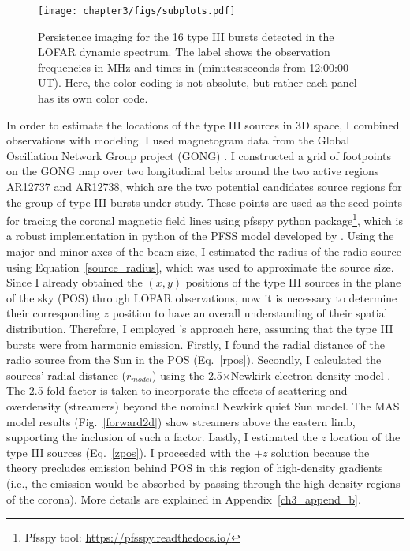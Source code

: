 \begin{figure}[ht]
\centering
\texttt{[image: chapter3/figs/subplots.pdf]}
\caption{Persistence imaging for the 16 type III bursts detected in the LOFAR dynamic spectrum. The label shows the observation frequencies in MHz and times in (minutes:seconds from 12:00:00 UT). Here, the color coding is not absolute, but rather each panel has its own color code.}
\label{fig_persistence}
\end{figure}

In order to estimate the locations of the type III sources in 3D space, I combined observations with modeling. I used magnetogram data from the Global Oscillation Network Group project (GONG) \citep{gong_1996}. I constructed a grid of footpoints on the GONG map over two longitudinal belts around the two active regions AR12737 and AR12738, which are the two potential candidates source regions for the group of type III bursts under study. These points are used as the seed points for tracing the coronal magnetic field lines using pfsspy python package\footnote{Pfsspy tool: \url{https://pfsspy.readthedocs.io/}}, which is a robust implementation in python of the PFSS model developed by \citet{pfss_2020}.
Using the major and minor axes of the beam size, I estimated the radius of the radio source using Equation~\ref{source_radius}, which was used to approximate the source size.
Since I already obtained the $(x,y)$ positions of the type III sources in the plane of the sky (POS) through LOFAR observations, now it is necessary to determine their corresponding $z$ position to have an overall understanding of their spatial distribution. Therefore, I employed \citet{badman_2022}'s approach here, assuming that the type III bursts were from harmonic emission. Firstly, I found the radial distance of the radio source from the Sun in the POS (Eq.~\ref{rpos}). Secondly, I calculated the sources' radial distance ($r_{model}$) using the 2.5$\times$Newkirk electron-density model \citep{newkirk_1961, newkirk_1967}. The 2.5 fold factor is taken to incorporate the effects of scattering and overdensity (streamers) beyond the nominal Newkirk quiet Sun model. The MAS model results (Fig.~\ref{forward2d}) show streamers above the eastern limb, supporting the inclusion of such a factor.
Lastly, I estimated the $z$ location of the type III sources (Eq.~\ref{zpos}).
I proceeded with the $+z$ solution because the theory precludes emission behind POS in this region of high-density gradients (i.e., the emission would be absorbed by passing through the high-density regions of the corona). More details are explained in Appendix~\ref{ch3_append_b}.

